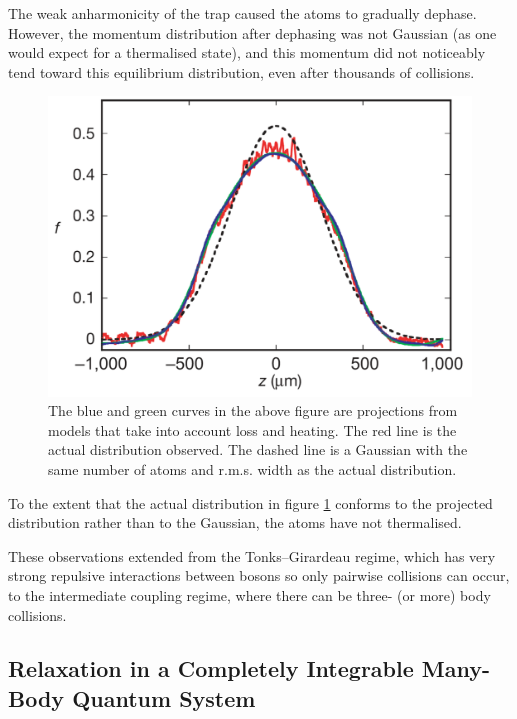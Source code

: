 \documentclass[a4paper, 10pt]{article}
\theoremstyle{plain}
\begin{document}
The weak anharmonicity of the trap caused the atoms to gradually dephase.
However, the momentum distribution after dephasing was not Gaussian (as one
would expect for a thermalised state), and this momentum did not noticeably
tend toward this equilibrium distribution, even after thousands of collisions.
\begin{figure}[H]
    \begin{center}
    \includegraphics[width=1.0\textwidth]{dephased_momentum_distribution}
    \end{center}
    \caption{\label{dephased_momentum_distribution}
             The blue and green curves in the above figure are projections from
             models that take into account loss and heating. The red line is the
             actual distribution observed. The dashed line is a Gaussian with
             the same number of atoms and r.m.s. width as the actual
             distribution.}
\end{figure}
To the extent that the actual distribution in figure
\ref{dephased_momentum_distribution} conforms to the projected distribution
rather than to the Gaussian, the atoms have not thermalised.

These observations extended from the Tonks--Girardeau regime, which has very
strong repulsive interactions between bosons so only pairwise collisions can
occur, to the intermediate coupling regime, where there can be three-
(or more) body collisions.


\subsection{Relaxation in a Completely Integrable Many-Body Quantum System}
\end{document}
